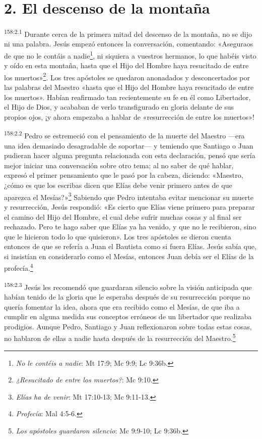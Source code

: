 \section*{2. El descenso de la montaña}
\par 
\textsuperscript{158:2.1} Durante cerca de la primera mitad del descenso de la montaña, no se dijo ni una palabra. Jesús empezó entonces la conversación, comentando: «Aseguraos de que no le contáis a nadie\footnote{\textit{No le contéis a nadie}: Mt 17:9; Mc 9:9; Lc 9:36b.}, ni siquiera a vuestros hermanos, lo que habéis visto y oído en esta montaña, hasta que el Hijo del Hombre haya resucitado de entre los muertos»\footnote{\textit{¿Resucitado de entre los muertos?}: Mc 9:10.}. Los tres apóstoles se quedaron anonadados y desconcertados por las palabras del Maestro «hasta que el Hijo del Hombre haya resucitado de entre los muertos». Habían reafirmado tan recientemente su fe en él como Libertador, el Hijo de Dios, y acababan de verlo transfigurado en gloria delante de sus propios ojos, ¡y ahora empezaba a hablar de «resurrección de entre los muertos»!

\par 
\textsuperscript{158:2.2} Pedro se estremeció con el pensamiento de la muerte del Maestro ---era una idea demasiado desagradable de soportar--- y temiendo que Santiago o Juan pudieran hacer alguna pregunta relacionada con esta declaración, pensó que sería mejor iniciar una conversación sobre otro tema; al no saber de qué hablar, expresó el primer pensamiento que le pasó por la cabeza, diciendo: «Maestro, ¿cómo es que los escribas dicen que Elías debe venir primero antes de que aparezca el Mesías?»\footnote{\textit{Elías ha de venir}: Mt 17:10-13; Mc 9:11-13.} Sabiendo que Pedro intentaba evitar mencionar su muerte y resurrección, Jesús respondió: «Es cierto que Elías viene primero para preparar el camino del Hijo del Hombre, el cual debe sufrir muchas cosas y al final ser rechazado. Pero te hago saber que Elías ya ha venido, y que no le recibieron, sino que le hicieron todo lo que quisieron». Los tres apóstoles se dieron cuenta entonces de que se refería a Juan el Bautista como si fuera Elías. Jesús sabía que, si insistían en considerarlo como el Mesías, entonces Juan debía ser el Elías de la profecía.\footnote{\textit{Profecía}: Mal 4:5-6.}

\par 
\textsuperscript{158:2.3} Jesús les recomendó que guardaran silencio sobre la visión anticipada que habían tenido de la gloria que le esperaba después de su resurrección porque no quería fomentar la idea, ahora que era recibido como el Mesías, de que iba a cumplir en alguna medida sus conceptos erróneos de un libertador que realizaba prodigios. Aunque Pedro, Santiago y Juan reflexionaron sobre todas estas cosas, no hablaron de ellas a nadie hasta después de la resurrección del Maestro.\footnote{\textit{Los apóstoles guardaron silencio}: Mc 9:9-10; Lc 9:36b.}

